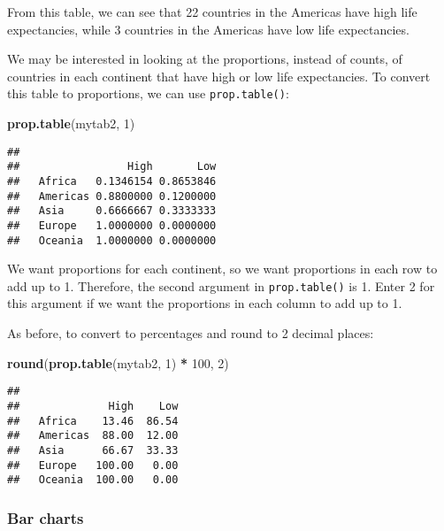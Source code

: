 \documentclass[
]{book}
\newenvironment{Shaded}{\begin{snugshade}}{\end{snugshade}}
\newcommand{\DecValTok}[1]{\textcolor[rgb]{0.00,0.00,0.81}{#1}}
\newcommand{\FunctionTok}[1]{\textcolor[rgb]{0.13,0.29,0.53}{\textbf{#1}}}
\newcommand{\NormalTok}[1]{#1}
\newcommand{\SpecialCharTok}[1]{\textcolor[rgb]{0.81,0.36,0.00}{\textbf{#1}}}
\begin{document}
From this table, we can see that 22 countries in the Americas have high life expectancies, while 3 countries in the Americas have low life expectancies.

We may be interested in looking at the proportions, instead of counts, of countries in each continent that have high or low life expectancies. To convert this table to proportions, we can use \texttt{prop.table()}:

\begin{Shaded}
\begin{Highlighting}[]
\FunctionTok{prop.table}\NormalTok{(mytab2, }\DecValTok{1}\NormalTok{) }
\end{Highlighting}
\end{Shaded}

\begin{verbatim}
##           
##                 High       Low
##   Africa   0.1346154 0.8653846
##   Americas 0.8800000 0.1200000
##   Asia     0.6666667 0.3333333
##   Europe   1.0000000 0.0000000
##   Oceania  1.0000000 0.0000000
\end{verbatim}

We want proportions for each continent, so we want proportions in each row to add up to 1. Therefore, the second argument in \texttt{prop.table()} is 1. Enter 2 for this argument if we want the proportions in each column to add up to 1.

As before, to convert to percentages and round to 2 decimal places:

\begin{Shaded}
\begin{Highlighting}[]
\FunctionTok{round}\NormalTok{(}\FunctionTok{prop.table}\NormalTok{(mytab2, }\DecValTok{1}\NormalTok{) }\SpecialCharTok{*} \DecValTok{100}\NormalTok{, }\DecValTok{2}\NormalTok{)}
\end{Highlighting}
\end{Shaded}

\begin{verbatim}
##           
##              High    Low
##   Africa    13.46  86.54
##   Americas  88.00  12.00
##   Asia      66.67  33.33
##   Europe   100.00   0.00
##   Oceania  100.00   0.00
\end{verbatim}

\hypertarget{bar-charts-1}{%
\subsubsection{Bar charts}\label{bar-charts-1}}
\end{document}
